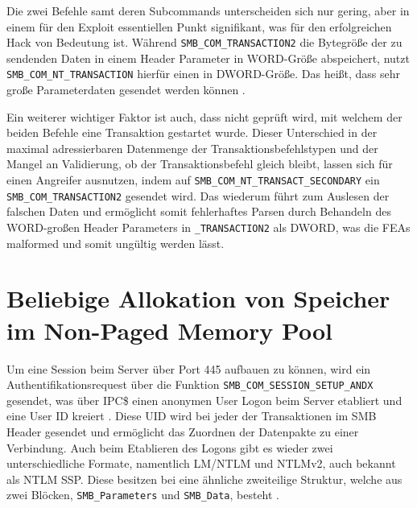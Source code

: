 \documentclass[DIV=12,headings=normal,pdftex,headinclude=false,footinclude=false,final]{scrreprt}
\begin{document}
\noindent
Die zwei Befehle samt deren Subcommands unterscheiden sich nur gering, aber in einem für den Exploit essentiellen Punkt signifikant, was für den erfolgreichen Hack von Bedeutung ist. Während \verb|SMB_COM_TRANSACTION2| die Bytegröße der zu sendenden Daten in einem Header Parameter in WORD-Größe abspeichert, nutzt \verb|SMB_COM_NT_TRANSACTION| hierfür einen in DWORD-Größe. Das heißt, dass sehr große Parameterdaten gesendet werden können \cite{CP}.

\noindent
Ein weiterer wichtiger Faktor ist auch, dass nicht geprüft wird, mit welchem der beiden Befehle eine Transaktion gestartet wurde. Dieser Unterschied in der maximal adressierbaren Datenmenge der Transaktionsbefehlstypen und der Mangel an Validierung, ob der Transaktionsbefehl gleich bleibt, lassen sich für einen Angreifer ausnutzen, indem auf \verb|SMB_COM_NT_TRANSACT_SECONDARY| ein \verb|SMB_COM_TRANSACTION2| gesendet wird\cite{SS:EB}. Das wiederum führt zum Auslesen der falschen Daten und ermöglicht somit fehlerhaftes Parsen durch Behandeln des WORD-großen Header Parameters in \verb|_TRANSACTION2| als DWORD, was die FEAs malformed und somit ungültig werden lässt\cite{CP}.

\section{Beliebige Allokation von Speicher im Non-Paged Memory Pool}\label{sec:MemAlloc}
Um eine Session beim Server über Port 445 aufbauen zu können, wird ein Authentifikationsrequest über die Funktion \verb|SMB_COM_SESSION_SETUP_ANDX| gesendet, was über IPC\$ einen anonymen User Logon beim Server etabliert und eine User ID kreiert \cite{MS:Auth}. Diese UID wird bei jeder der Transaktionen im SMB Header gesendet und ermöglicht das Zuordnen der Datenpakte zu einer Verbindung\cite{SS:EB}. Auch beim Etablieren des Logons gibt es wieder zwei unterschiedliche Formate, namentlich LM/NTLM und NTLMv2, auch bekannt als NTLM SSP. Diese besitzen bei eine ähnliche zweiteilige Struktur, welche aus zwei Blöcken, \verb|SMB_Parameters| und \verb|SMB_Data|, besteht \cite{MS:SMBCom}.
\end{document}
